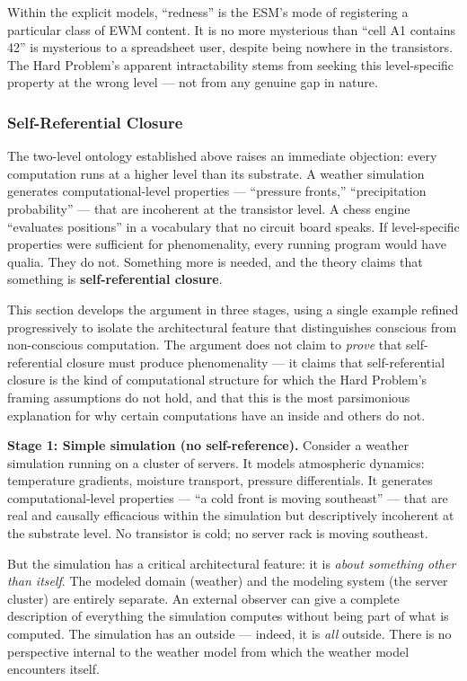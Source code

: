 \documentclass[12pt]{article}
\newcommand{\revstart}{}
\begin{document}
Within the explicit models, ``redness'' is the ESM's mode of registering a particular class of EWM content. It is no more mysterious than ``cell A1 contains 42'' is mysterious to a spreadsheet user, despite being nowhere in the transistors. The Hard Problem's apparent intractability stems from seeking this level-specific property at the wrong level --- not from any genuine gap in nature.


\subsubsection{Self-Referential Closure}


{\revstart The two-level ontology established above raises an immediate objection: every computation runs at a higher level than its substrate. A weather simulation generates computational-level properties --- ``pressure fronts,'' ``precipitation probability'' --- that are incoherent at the transistor level. A chess engine ``evaluates positions'' in a vocabulary that no circuit board speaks. If level-specific properties were sufficient for phenomenality, every running program would have qualia. They do not. Something more is needed, and the theory claims that something is \textbf{self-referential closure}.

This section develops the argument in three stages, using a single example refined progressively to isolate the architectural feature that distinguishes conscious from non-conscious computation. The argument does not claim to \emph{prove} that self-referential closure must produce phenomenality --- it claims that self-referential closure is the kind of computational structure for which the Hard Problem's framing assumptions do not hold, and that this is the most parsimonious explanation for why certain computations have an inside and others do not.

\textbf{Stage 1: Simple simulation (no self-reference).} Consider a weather simulation running on a cluster of servers. It models atmospheric dynamics: temperature gradients, moisture transport, pressure differentials. It generates computational-level properties --- ``a cold front is moving southeast'' --- that are real and causally efficacious within the simulation but descriptively incoherent at the substrate level. No transistor is cold; no server rack is moving southeast.

But the simulation has a critical architectural feature: it is \emph{about something other than itself}. The modeled domain (weather) and the modeling system (the server cluster) are entirely separate. An external observer can give a complete description of everything the simulation computes without being part of what is computed. The simulation has an outside --- indeed, it is \emph{all} outside. There is no perspective internal to the weather model from which the weather model encounters itself.

}
\end{document}
